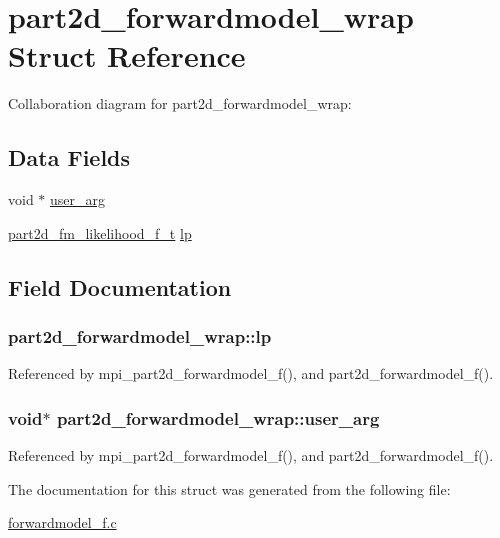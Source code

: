 \hypertarget{structpart2d__forwardmodel__wrap}{}\section{part2d\+\_\+forwardmodel\+\_\+wrap Struct Reference}
\label{structpart2d__forwardmodel__wrap}


Collaboration diagram for part2d\+\_\+forwardmodel\+\_\+wrap\+:
\subsection*{Data Fields}
\begin{DoxyCompactItemize}
\item 
void $\ast$ \hyperlink{structpart2d__forwardmodel__wrap_a8b9a87d9b08c56e4bda814a7e9835e80}{user\+\_\+arg}
\item 
\hyperlink{forwardmodel__f_8h_a3c000248c5bc114e21c6f36aff105854}{part2d\+\_\+fm\+\_\+likelihood\+\_\+f\+\_\+t} \hyperlink{structpart2d__forwardmodel__wrap_a739992e5da649c6bb29a4cfc612913f5}{lp}
\end{DoxyCompactItemize}


\subsection{Field Documentation}
\subsubsection[{\texorpdfstring{lp}{lp}}]{ part2d\+\_\+forwardmodel\+\_\+wrap\+::lp}\hypertarget{structpart2d__forwardmodel__wrap_a739992e5da649c6bb29a4cfc612913f5}{}\label{structpart2d__forwardmodel__wrap_a739992e5da649c6bb29a4cfc612913f5}


Referenced by mpi\+\_\+part2d\+\_\+forwardmodel\+\_\+f(), and part2d\+\_\+forwardmodel\+\_\+f().

\subsubsection[{\texorpdfstring{user\+\_\+arg}{user_arg}}]{\setlength{\rightskip}{0pt plus 5cm}void$\ast$ part2d\+\_\+forwardmodel\+\_\+wrap\+::user\+\_\+arg}\hypertarget{structpart2d__forwardmodel__wrap_a8b9a87d9b08c56e4bda814a7e9835e80}{}\label{structpart2d__forwardmodel__wrap_a8b9a87d9b08c56e4bda814a7e9835e80}


Referenced by mpi\+\_\+part2d\+\_\+forwardmodel\+\_\+f(), and part2d\+\_\+forwardmodel\+\_\+f().



The documentation for this struct was generated from the following file\+:\begin{DoxyCompactItemize}
\item 
\hyperlink{forwardmodel__f_8c}{forwardmodel\+\_\+f.\+c}\end{DoxyCompactItemize}
